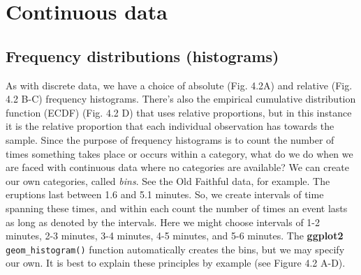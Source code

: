 \documentclass[english,10pt,a4paper,oneside]{book}
\theoremstyle{definition}
\theoremstyle{definition}
\theoremstyle{definition}
\theoremstyle{remark}
\begin{document}
\hypertarget{continuous-data-1}{%
\section{Continuous data}\label{continuous-data-1}}

\hypertarget{frequency-distributions-histograms}{%
\subsection{Frequency distributions
(histograms)}\label{frequency-distributions-histograms}}

As with discrete data, we have a choice of absolute (Fig. 4.2A) and
relative (Fig. 4.2 B-C) frequency histograms. There's also the empirical
cumulative distribution function (ECDF) (Fig. 4.2 D) that uses relative
proportions, but in this instance it is the relative proportion that
each individual observation has towards the sample. Since the purpose of
frequency histograms is to count the number of times something takes
place or occurs within a category, what do we do when we are faced with
continuous data where no categories are available? We can create our own
categories, called \emph{bins}. See the Old Faithful data, for example.
The eruptions last between 1.6 and 5.1 minutes. So, we create intervals
of time spanning these times, and within each count the number of times
an event lasts as long as denoted by the intervals. Here we might choose
intervals of 1-2 minutes, 2-3 minutes, 3-4 minutes, 4-5 minutes, and 5-6
minutes. The \textbf{ggplot2} \texttt{geom\_histogram()} function
automatically creates the bins, but we may specify our own. It is best
to explain these principles by example (see Figure 4.2 A-D).
\end{document}
